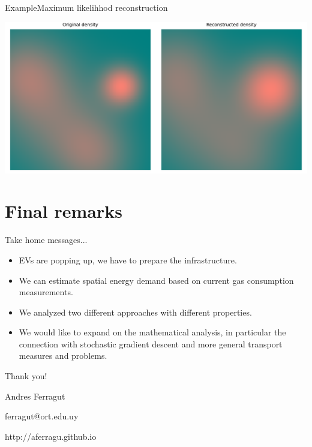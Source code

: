 \documentclass[aspectratio=169]{beamer}
\begin{document}
\begin{frame}{Example}{Maximum likelihhod reconstruction}

			\centering
			\includegraphics[width=0.9\columnwidth]{figuras/maximum_likelihood_reconstruction.pdf}

			
\end{frame}



	

\section{Final remarks}

\begin{frame}{Take home messages...}
\begin{itemize}
	\item EVs are popping up, we have to prepare the infrastructure.
	
	\vfill
	\item We can estimate spatial energy demand based on current gas consumption measurements.
	
	\vfill
	\item We analyzed two different approaches with different properties.
	
	\vfill
	\item We would like to expand on the mathematical analysis, in particular the connection with stochastic gradient descent and more general transport measures and problems.
\end{itemize}
\end{frame}

\begin{frame}[plain]
	
	
	\vfill
	
	{\Huge \alert{Thank you!}}
	
	
	\vfill
	
	Andres Ferragut
	
	ferragut@ort.edu.uy
	
	\alert{http://aferragu.github.io}
	
	
\end{frame}
\end{document}
